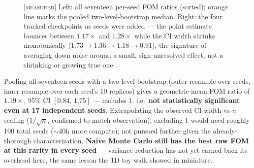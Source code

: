 \documentclass[11pt,a4paper]{article}
\newcommand{\MEAS}{\textcolor{blue!60!black}{\footnotesize[\textsc{measured}]}}
\begin{document}
\begin{figure}[H]\centering
{}\hfill
{}
\caption{\MEAS{} Left: all seventeen per-seed FOM ratios (sorted); orange line marks the pooled
two-level-bootstrap median. Right: the four tracked checkpoints as seeds were added --- the point
estimate bounces between $1.17\times$ and $1.28\times$ while the CI width shrinks monotonically
($1.73\to1.36\to1.18\to0.91$), the signature of averaging down noise around a small,
sign-unresolved effect, not a shrinking or growing true one.}
\label{fig:manseedsweep}
\end{figure}

Pooling all seventeen seeds with a two-level bootstrap (outer resample over seeds, inner resample
over each seed's 10 replicas) gives a geometric-mean FOM ratio of $1.19\times$, 95\% CI
$[0.84,\,1.75]$ --- includes 1, i.e.\ \textbf{not statistically significant even at 17 independent
seeds}. Extrapolating the observed CI-width-vs-$n$ scaling ($1/\sqrt n$, confirmed to match
observation), excluding 1 would need roughly 100 total seeds ($\sim$40h more compute); not
pursued further given the already-thorough characterization. \textbf{Naive Monte Carlo still has
the best raw FOM at this rarity in every seed} --- variance reduction has not yet earned back its
overhead here, the same lesson the 1D toy walk showed in miniature.
\end{document}
